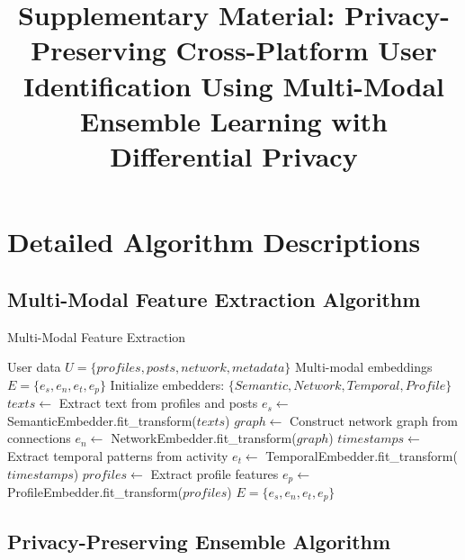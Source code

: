 \documentclass[conference]{IEEEtran}
\begin{document}
\title{Supplementary Material: Privacy-Preserving Cross-Platform User Identification Using Multi-Modal Ensemble Learning with Differential Privacy}

\author{
}

\maketitle

\section{Detailed Algorithm Descriptions}

\subsection{Multi-Modal Feature Extraction Algorithm}

\begin{algorithm}
\caption{Multi-Modal Feature Extraction}
\label{alg:feature_extraction}
\begin{algorithmic}[1]
\REQUIRE User data $U = \{profiles, posts, network, metadata\}$
\ENSURE Multi-modal embeddings $E = \{e_s, e_n, e_t, e_p\}$
\STATE Initialize embedders: $\{Semantic, Network, Temporal, Profile\}$
\STATE $texts \leftarrow$ Extract text from profiles and posts
\STATE $e_s \leftarrow$ SemanticEmbedder.fit\_transform($texts$)
\STATE $graph \leftarrow$ Construct network graph from connections
\STATE $e_n \leftarrow$ NetworkEmbedder.fit\_transform($graph$)
\STATE $timestamps \leftarrow$ Extract temporal patterns from activity
\STATE $e_t \leftarrow$ TemporalEmbedder.fit\_transform($timestamps$)
\STATE $profiles \leftarrow$ Extract profile features
\STATE $e_p \leftarrow$ ProfileEmbedder.fit\_transform($profiles$)
\RETURN $E = \{e_s, e_n, e_t, e_p\}$
\end{algorithmic}
\end{algorithm}

\subsection{Privacy-Preserving Ensemble Algorithm}
\end{document}
